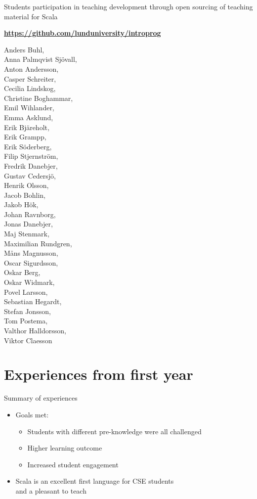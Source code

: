 \documentclass{lecturenotes}
\newcommand{\Section}[1]{\section{#1}\frame{\centering\huge\bfseries\textcolor{blue}{#1}}}
\begin{document}
\begin{Slide}{Students participation in teaching development through open sourcing of teaching material for Scala}

\textbf{\url{https://github.com/lunduniversity/introprog}}

\begin{multicols}{3}\footnotesize
Anders Buhl, \\Anna Palmqvist Sjövall, \\Anton Andersson, \\Casper Schreiter, \\Cecilia Lindskog, \\Christine Boghammar, \\Emil Wihlander, \\Emma Asklund, \\Erik Bjäreholt, \\Erik Grampp, \\Erik Söderberg, \\Filip Stjernström, \\Fredrik Danebjer, \\Gustav Cedersjö, \\Henrik Olsson, \\Jacob Bohlin, \\Jakob Hök, \\Johan Ravnborg, \\Jonas Danebjer, \\Maj Stenmark, \\Maximilian Rundgren, \\Måns Magnusson, \\Oscar Sigurdsson, \\Oskar Berg, \\Oskar Widmark, \\Povel Larsson, \\Sebastian Hegardt, \\Stefan Jonsson, \\Tom Postema, \\Valthor Halldorsson, \\Viktor Claesson
\end{multicols}

\end{Slide}



\Section{Experiences from first year}


\begin{Slide}{Summary of experiences}
\begin{itemize}
\item Goals met:
\begin{itemize}
\item Students with different pre-knowledge were all challenged
\item Higher learning outcome
\item Increased student engagement
\end{itemize}
\item Scala is an excellent first language for CSE students\\ and a pleasant to teach
\end{itemize}
\end{Slide}
\end{document}

